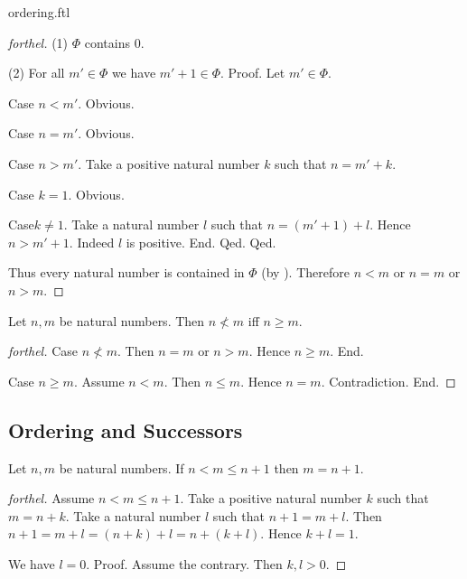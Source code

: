 \documentclass{naproche-library}
\begin{document}
\begin{smodule}{ordering.ftl}
\begin{proof}[forthel]
    (1) $\Phi$ contains $0$.

    (2) For all $m' \in \Phi$ we have $m' + 1 \in \Phi$. \newline
    Proof.
      Let $m' \in \Phi$.

      Case $n < m'$. Obvious.

      Case $n = m'$. Obvious.

      Case $n > m'$.
        Take a positive natural number $k$ such that $n = m' + k$.

        Case $k = 1$. Obvious.

        Case$k \neq 1$.
          Take a natural number $l$ such that $n = (m' + 1) + l$.
          Hence $n > m' + 1$.
          Indeed $l$ is positive.
        End.
      Qed.
    Qed.

    Thus every natural number is contained in $\Phi$ (by ).
    Therefore $n < m$ or $n = m$ or $n > m$.
  \end{proof}

  \begin{proposition}[forthel,id=ARITHMETIC_04_6991525988794368]
    Let $n, m$ be natural numbers.
    Then $n \nless m$ iff $n \geq m$.
  \end{proposition}
  \begin{proof}[forthel]
    Case $n \nless m$.
      Then $n = m$ or $n > m$.
      Hence $n \geq m$.
    End.

    Case $n \geq m$.
      Assume $n < m$.
      Then $n \leq m$.
      Hence $n = m$.
      Contradiction.
    End.
  \end{proof}


  \subsection*{Ordering and Successors}

  \begin{proposition}[forthel,id=ARITHMETIC_04_7006203091615744]
    Let $n, m$ be natural numbers.
    If $n < m \leq n + 1$ then $m = n + 1$.
  \end{proposition}
  \begin{proof}[forthel]
    Assume $n < m \leq n + 1$.
    Take a positive natural number $k$ such that $m = n + k$.
    Take a natural number $l$ such that $n + 1 = m + l$.
    Then $n + 1
      = m + l
      = (n + k) + l
      = n + (k + l)$.
    Hence $k + l = 1$.

    We have $l = 0$. \newline
    Proof.
      Assume the contrary.
      Then $k,l > 0$.


\end{proof}
\end{smodule}
\end{document}
